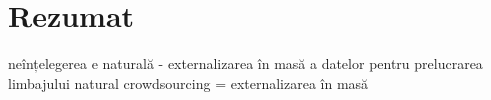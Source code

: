 \manualmark
{}

\chapter*{Rezumat}

neînțelegerea e naturală - externalizarea în masă a datelor pentru prelucrarea limbajului natural
crowdsourcing = externalizarea în masă %